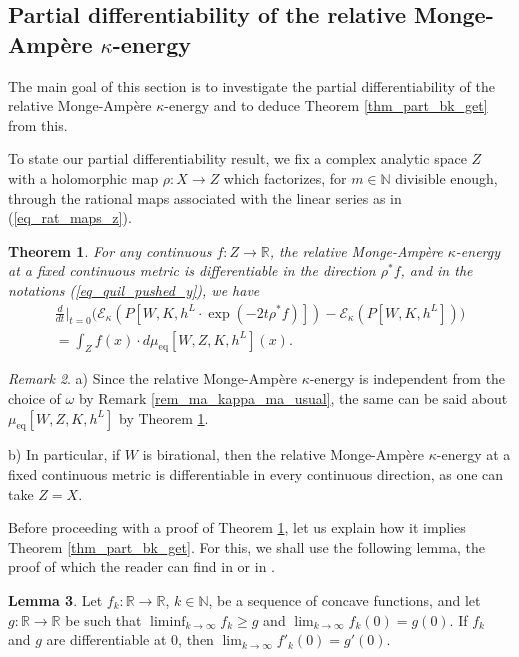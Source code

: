 \documentclass[12pt]{article}
\numberwithin{equation}{section}
\theoremstyle{theorem}
\newtheorem{thm}{Theorem}[section]
\theoremstyle{definition}
\newtheorem{lem}[thm]{Lemma}
\theoremstyle{remark}
\newtheorem{rem}[thm]{Remark}
\newcommand{\real}{\mathbb{R}}
\newcommand{\nat}{\mathbb{N}}
\begin{document}
	
	\subsection{Partial differentiability of the relative Monge-Ampère $\kappa$-energy}\label{sect_different}
	The main goal of this section is to investigate the partial differentiability of the relative Monge-Ampère $\kappa$-energy and to deduce Theorem \ref{thm_part_bk_get} from this.
	\par 
	To state our partial differentiability result, we fix a complex analytic space $Z$ with a holomorphic map $\rho : X \to Z$ which factorizes, for $m \in \nat$ divisible enough, through the rational maps associated with the linear series as in (\ref{eq_rat_maps_z}).
	\begin{thm}\label{thm_differentiab}
		For any continuous $f : Z \to \real$, the relative Monge-Ampère $\kappa$-energy at a fixed continuous metric is differentiable in the direction $\rho^* f$, and in the notations (\ref{eq_quil_pushed_y}), we have 
		\begin{multline}
			\frac{d}{dt}\Big|_{t = 0}
			\Big(
			\mathscr{E}_{\kappa}(P[W, K, h^L \cdot \exp(- 2 t \rho^* f)])
			-
			\mathscr{E}_{\kappa}(P[W, K, h^L])
			\Big)
			\\
			=
			\int_Z f(x) \cdot d \mu_{\mathrm{eq}}[W, Z, K, h^L](x).
		\end{multline}
	\end{thm}
	\begin{rem}\label{rem_indep_mueq}
		a)
		Since the relative Monge-Ampère $\kappa$-energy is independent from the choice of $\omega$ by Remark \ref{rem_ma_kappa_ma_usual}, the same can be said about $\mu_{\mathrm{eq}}[W, Z, K, h^L]$ by Theorem \ref{thm_differentiab}.
		\par 
		b) In particular, if $W$ is birational, then the relative Monge-Ampère $\kappa$-energy at a fixed continuous metric is differentiable in every continuous direction, as one can take $Z = X$.
	\end{rem}
	Before proceeding with a proof of Theorem \ref{thm_differentiab}, let us explain how it implies Theorem \ref{thm_part_bk_get}.
	For this, we shall use the following lemma, the proof of which the reader can find in \cite[Lemma 6.6]{BermanBouckBalls} or in \cite{YuanEquidistr}.
	\begin{lem}\label{lem_yuan}
		Let $f_k: \real \to \real$, $k \in \nat$, be a sequence of concave functions, and let $g: \real \to \real$ be such that $\liminf_{k \to \infty} f_k \geq g$ and $\lim_{k \to \infty} f_k(0) = g(0)$. 
		If $f_k$ and $g$ are differentiable at $0$, then $\lim_{k \to \infty} f'_k(0) = g'(0)$.
	\end{lem}
\end{document}
